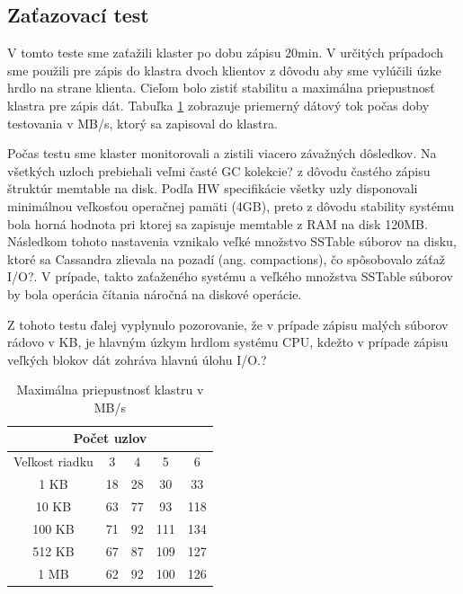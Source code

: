 \documentclass[11pt,twoside,a4paper]{book}
\begin{document}
\subsection*{Zaťazovací test}

V tomto teste sme zaťažili klaster po dobu zápisu 20min. V určitých prípadoch sme použili pre zápis do klastra dvoch klientov z dôvodu aby sme vylúčili úzke hrdlo na strane klienta. Cieľom bolo zistiť stabilitu a maximálna priepustnosť klastra pre zápis dát. Tabuľka \ref{tab:CPerf1} zobrazuje priemerný dátový tok počas doby testovania v MB/s, ktorý sa zapisoval do klastra.

Počas testu sme klaster monitorovali a zistili viacero závažných dôsledkov. Na všetkých uzloch prebiehali veľmi časté GC kolekcie? z dôvodu častého zápisu štruktúr memtable na disk. Podľa HW specifikácie všetky uzly disponovali minimálnou veľkosťou operačnej pamäti (4GB), preto z dôvodu stability systému bola horná hodnota pri ktorej sa zapisuje memtable z RAM na disk 120MB. Následkom tohoto nastavenia vznikalo veľké množstvo SSTable súborov na disku, ktoré sa Cassandra zlievala na pozadí (ang. compactions), čo spôsobovalo záťaž I/O?. V prípade, takto zaťaženého systému a veľkého množstva SSTable súborov by bola operácia čítania náročná na diskové operácie. 

Z tohoto testu ďalej vyplynulo pozorovanie, že v prípade zápisu malých súborov rádovo v KB, je hlavným úzkym hrdlom systému CPU, kdežto v prípade zápisu veľkých blokov dát zohráva hlavnú úlohu I/O.?

\begin{table}[htp]
\begin{center}
\begin{tabular}{|c|c|c|c|c|}
\hline
\multicolumn{5}{|c|}{Počet uzlov}  \\
\hline Veľkost riadku & 3 & 4 & 5 & 6\\ 
\hline
\hline 1 KB & 18 & 28 & 30 & 33\\ 
\hline 10 KB & 63 & 77 & 93 & 118 \\ 
\hline 100 KB & 71 & 92 & 111 & 134\\ 
\hline 512 KB & 67 & 87 & 109 & 127\\  
\hline 1 MB & 62 & 92 & 100 & 126\\ 
\hline
\end{tabular} 
\end{center}
\caption{Maximálna priepustnosť klastru v MB/s}
\label{tab:CPerf1}
\end{table}
\end{document}
